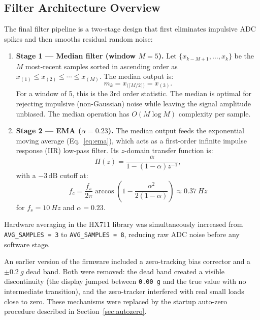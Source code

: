 \documentclass[12pt,a4paper]{article}
\begin{document}
\subsection{Filter Architecture Overview}

The final filter pipeline is a two-stage design that first eliminates impulsive ADC
spikes and then smooths residual random noise:

\begin{enumerate}
  \item \textbf{Stage 1 --- Median filter (window $M=5$).}
        Let $\{x_{k-M+1},\ldots,x_k\}$ be the $M$ most-recent samples sorted in
        ascending order as $x_{(1)} \le x_{(2)} \le \cdots \le x_{(M)}$. The median
        output is:
        \begin{equation}
          m_k = x_{\bigl(\lceil M/2 \rceil\bigr)} = x_{(3)}.
          \label{eq:median}
        \end{equation}
        For a window of 5, this is the 3rd order statistic. The median is optimal for
        rejecting impulsive (non-Gaussian) noise while leaving the signal amplitude
        unbiased. The median operation has $O(M\log M)$ complexity per sample.

  \item \textbf{Stage 2 --- EMA ($\alpha = 0.23$).} The median output feeds the
        exponential moving average (Eq.~\ref{eq:ema}), which acts as a first-order
        infinite impulse response (IIR) low-pass filter. Its $z$-domain transfer
        function is:
        \begin{equation}
          H(z) = \frac{\alpha}{1-(1-\alpha)z^{-1}},
          \label{eq:ema_tf}
        \end{equation}
        with a $-3\,\text{dB}$ cutoff at:
        \begin{equation}
          f_c = \frac{f_s}{2\pi}\arccos\!\left(1 - \frac{\alpha^2}{2(1-\alpha)}\right)
              \approx \SI{0.37}{Hz}
          \label{eq:ema_fc}
        \end{equation}
        for $f_s = \SI{10}{Hz}$ and $\alpha = 0.23$.
\end{enumerate}

Hardware averaging in the HX711 library was simultaneously increased from
\texttt{AVG\_SAMPLES\,=\,3} to \texttt{AVG\_SAMPLES\,=\,8}, reducing raw ADC noise
before any software stage.

An earlier version of the firmware included a zero-tracking bias corrector and a
$\pm\SI{0.2}{g}$ dead band. Both were removed: the dead band created a visible
discontinuity (the display jumped between \texttt{0.00\,g} and the true value with no
intermediate transition), and the zero-tracker interfered with real small loads close to
zero. These mechanisms were replaced by the startup auto-zero procedure described in
Section~\ref{sec:autozero}.
\end{document}
